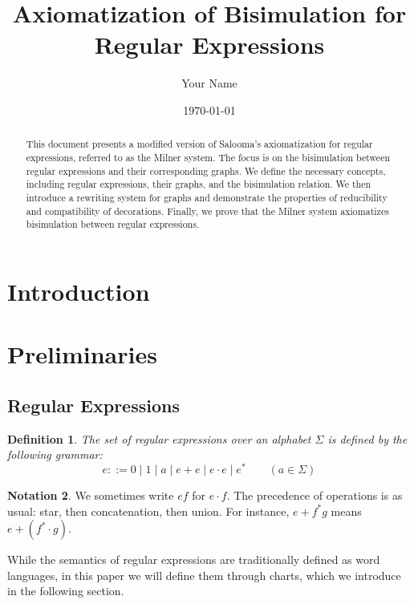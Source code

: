 \documentclass{article}
\newtheorem{definition}{Definition}[section]
\begin{document}
\title{Axiomatization of Bisimulation for Regular Expressions}
\author{Your Name}
\date{\today}
\maketitle  
\begin{abstract}
This document presents a modified version of Salooma's axiomatization for regular expressions, referred to as the Milner system. The focus is on the bisimulation between regular expressions and their corresponding graphs. We define the necessary concepts, including regular expressions, their graphs, and the bisimulation relation. We then introduce a rewriting system for graphs and demonstrate the properties of reducibility and compatibility of decorations. Finally, we prove that the Milner system axiomatizes bisimulation between regular expressions.

\end{abstract}
\section{Introduction}

\section{Preliminaries}

\subsection{Regular Expressions}
\begin{definition}
The set of \emph{regular expressions} over an alphabet $\Sigma$ is defined by the following grammar:
\[
e ::= 0 \mid 1 \mid a \mid e + e \mid e\cdot e \mid e^* \qquad (a \in \Sigma)
\]
\end{definition}

\vspace{1em}
\theoremstyle{definition}
\newtheorem{notation}[definition]{Notation}

\begin{notation} 
We sometimes write $ef$ for $e \cdot f$. The precedence of operations is as usual: star, then concatenation, then union. For instance, $e+f^*g$ means $e+(f^*\cdot g)$.
\end{notation}
\vspace{1em}

While the semantics of regular expressions are traditionally defined as word languages, in this paper we will define them through charts, which we introduce in the following section.
\end{document}

